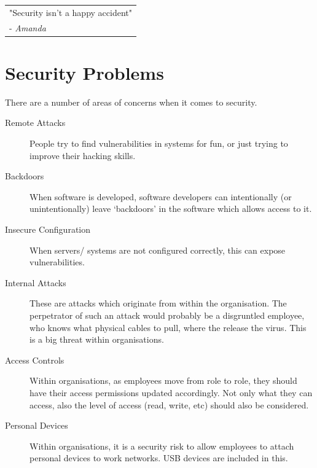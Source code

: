 
\begin{table}[H]
    \centering
    \begin{tabular}{|p{}}
        "Security isn't a happy accident"\\
        - \textit{Amanda}
    \end{tabular}
\end{table}

\section*{Security Problems}
There are a number of areas of concerns when it comes to security.
\begin{description}
    \item[Remote Attacks] People try to find vulnerabilities in systems for fun, or just trying to improve their hacking skills.
    \item[Backdoors] When software is developed, software developers can intentionally (or unintentionally) leave `backdoors' in the software which allows access to it.
    \item[Insecure Configuration] When servers/ systems are not configured correctly, this can expose vulnerabilities.
    \item[Internal Attacks] These are attacks which originate from within the organisation. The perpetrator of such an attack would probably be a disgruntled employee, who knows what physical cables to pull, where the release the virus. This is a big threat within organisations.
    \item[Access Controls] Within organisations, as employees move from role to role, they should have their access permissions updated accordingly. Not only what they can access, also the level of access (read, write, etc) should also be considered.
    \item[Personal Devices] Within organisations, it is a security risk to allow employees to attach personal devices to work networks. USB devices are included in this.
\end{description}

